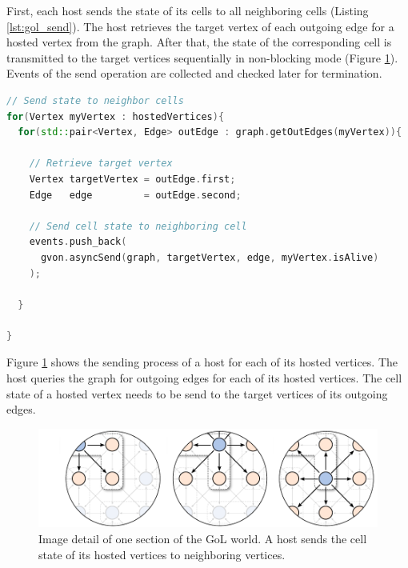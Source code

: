 First, each host sends the state of its cells to all neighboring
cells (Listing \ref{lst:gol_send}). The host retrieves the target
vertex of each outgoing edge for a hosted vertex from the graph. After that,
the state of the corresponding cell is transmitted to the target vertices
sequentially in non-blocking mode (Figure
\ref{fig:gol_communication}). Events of the send operation are
collected and checked later for termination.

\begin{minipage}[t]{\textwidth} 
\begin{lstlisting}[language=C++, label=lst:gol_send, caption={A host sends the cell state of its hosted vertices to all neighboring vertices. The information of neighboring vertices is retrieved from the graph. The cell states are send in the non-blocking variant.}]
// Send state to neighbor cells
for(Vertex myVertex : hostedVertices){
  for(std::pair<Vertex, Edge> outEdge : graph.getOutEdges(myVertex)){

    // Retrieve target vertex
    Vertex targetVertex = outEdge.first;
    Edge   edge         = outEdge.second;

    // Send cell state to neighboring cell
    events.push_back(
      gvon.asyncSend(graph, targetVertex, edge, myVertex.isAlive)
    );

  }

}
\end{lstlisting}
\end{minipage}

\noindent Figure \ref{fig:gol_communication} shows the sending process
of a host for each of its hosted vertices. The host queries the graph
for outgoing edges for each of its hosted vertices. The cell state of
a hosted vertex needs to be send to the target vertices of its outgoing
edges.

\begin{figure}[H]
  \centering
  \includegraphics[width=\textwidth]{graphics/40_gol_communication}
  \caption{Image detail of one section of the GoL world. A host sends
    the cell state of its hosted vertices to neighboring vertices.}
  \label{fig:gol_communication}
\end{figure}

